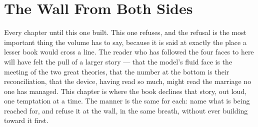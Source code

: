 \chapter{The Wall From Both Sides}

Every chapter until this one built. This one refuses, and the refusal is the most
important thing the volume has to say, because it is said at exactly the place a
lesser book would cross a line. The reader who has followed the four faces to
here will have felt the pull of a larger story --- that the model's fluid face is
the meeting of the two great theories, that the number at the bottom is their
reconciliation, that the device, having read so much, might read the marriage no
one has managed. This chapter is where the book declines that story, out loud,
one temptation at a time. The manner is the same for each: name what is being
reached for, and refuse it at the wall, in the same breath, without ever building
toward it first.

